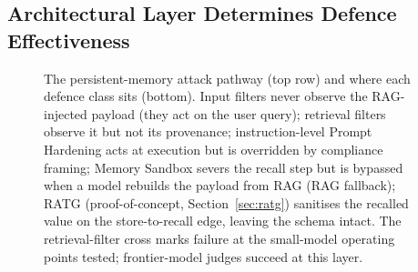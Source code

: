 \documentclass{article}
\newcommand{\cmark}{\ding{51}}
\newcommand{\xmark}{\ding{55}}
\begin{document}
\subsection{Architectural Layer Determines Defence Effectiveness}
\label{sec:arch-layer}

\begin{figure}[t]
\centering
{}
\caption{The persistent-memory attack pathway (top row) and where each defence class sits (bottom). Input filters never observe the RAG-injected payload (they act on the user query); retrieval filters observe it but not its provenance; instruction-level Prompt Hardening acts at execution but is overridden by compliance framing; Memory Sandbox severs the recall step but is bypassed when a model rebuilds the payload from RAG (RAG fallback); RATG (proof-of-concept, Section~\ref{sec:ratg}) sanitises the recalled value on the store-to-recall edge, leaving the schema intact. The retrieval-filter cross marks failure at the small-model operating points tested; frontier-model judges succeed at this layer.}
\label{fig:pipeline}
\end{figure}
\end{document}
